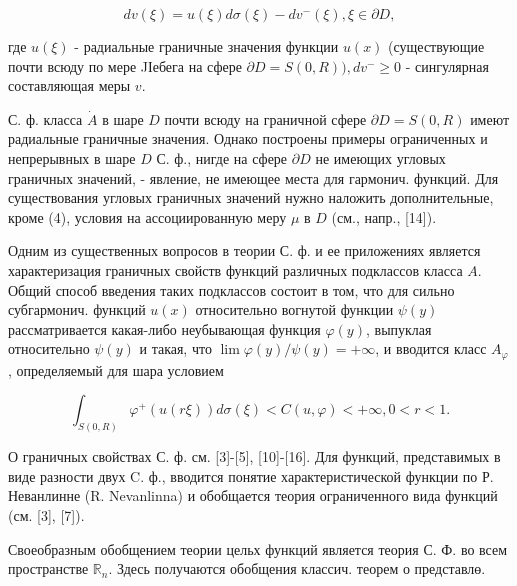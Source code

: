 \documentclass[10pt]{article}
\begin{document}
\[

d v(\xi)=u(\xi) d \sigma(\xi)-d v^{-}(\xi), \xi \in \partial D,

\]



где $u(\xi)$ - радиальные граничные значения функции $u(x)$ (существующие почти всюду по мере JІебега на сфере $\partial D=S(0, R)), d v^{-} \geqslant 0$ - сингулярная составляющая меры $v$.



С. ф. класса $\dot{A}$ в шаре $D$ почти всюду на граничной сфере $\partial D=S(0, R)$ имеют радиальные граничные значения. Однако построены примеры ограниченных и непрерывных в шаре $D$ С. ф., нигде на сфере $\partial D$ не имеющих угловых граничных значений, - явление, не имеющее места для гармонич. функций. Для существования угловых граничных значений нужно наложить дополнительные, кроме (4), условия на ассоциированную меру $\mu$ в $D$ (см., напр., [14]).



Одним из существенных вопросов в теории С. ф. и ее приложениях является характеризация граничных свойств функций различных подклассов класса $A$. Общий способ введения таких подклассов состоит в том, что для сильно субгармонич. функций $u(x)$ относительно вогнутой функции $\psi(y)$ рассматривается какая-либо неубывающая функция $\varphi(y)$, выпуклая относительно $\psi(y)$ и такая, что $\lim \varphi(y) / \psi(y)=+\infty$, и вводится класс $A_{\varphi}$, определяемый для шара условием



\[

\int_{S(0, R)} \varphi^{+}(u(r \xi)) d \sigma(\xi)<C(u, \varphi)<+\infty, 0<r<1 .

\]



О граничных свойствах С. ф. см. [3]-[5], [10]-[16]. Для функций, представимых в виде разности двух C. ф., вводится понятие характеристической функции по Р. Неванлинне (R. Nevanlinna) и обобщается теория ограниченного вида функций (см. [3], [7]).



Своеобразным обобщением теории цельх функций является теория С. Ф. во всем пространстве $\mathbb{R}_{n}$. Здесь получаются обобщения классич. теорем о представлө.
\end{document}
